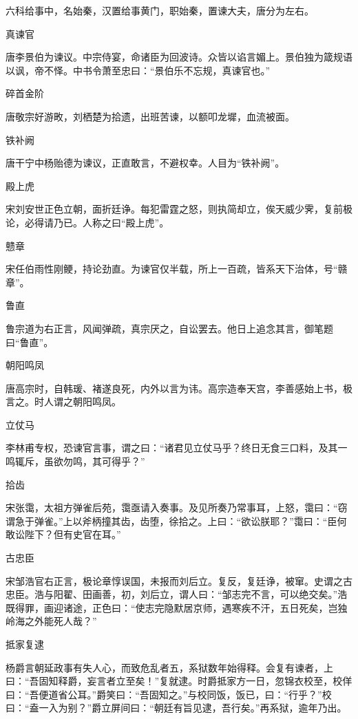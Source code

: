 \documentclass[a4paper,12pt,UTF8,twoside]{ctexbook}
\begin{document}
    六科给事中，名始秦，汉置给事黄门，职始秦，置谏大夫，唐分为左右。
    
    真谏官
    
    唐李景伯为谏议。中宗侍宴，命诸臣为回波诗。众皆以谄言媚上。景伯独为箴规语以讽，帝不怿。中书令萧至忠曰：“景伯乐不忘规，真谏官也。”
    
    碎首金阶
    
    唐敬宗好游畋，刘栖楚为拾遗，出班苦谏，以额叩龙墀，血流被面。
    
    铁补阙
    
    唐干宁中杨贻德为谏议，正直敢言，不避权幸。人目为“铁补阙”。
    
    殿上虎
    
    宋刘安世正色立朝，面折廷诤。每犯雷霆之怒，则执简却立，俟天威少霁，复前极论，必得请乃已。人称之曰“殿上虎”。
    
    戆章
    
    宋任伯雨性刚鲠，持论劲直。为谏官仅半载，所上一百疏，皆系天下治体，号“赣章”。
    
    鲁直
    
    鲁宗道为右正言，风闻弹疏，真宗厌之，自讼罢去。他日上追念其言，御笔题曰“鲁直”。
    
    朝阳鸣凤
    
    唐高宗时，自韩瑗、褚遂良死，内外以言为讳。高宗造奉天宫，李善感始上书，极言之。时人谓之朝阳鸣凤。
    
    立仗马
    
    李林甫专权，恐谏官言事，谓之曰：“诸君见立仗马乎？终日无食三口料，及其一鸣辄斥，虽欲勿鸣，其可得乎？”
    
    拾齿
    
    宋张霭，太祖方弹雀后苑，霭亟请入奏事。及见所奏乃常事耳，上怒，霭曰：“窃谓急于弹雀。”上以斧柄撞其齿，齿堕，徐拾之。上曰：“欲讼朕耶？”霭曰：“臣何敢讼陛下？但有史官在耳。”
    
    古忠臣
    
    宋邹浩官右正言，极论章惇误国，未报而刘后立。复反，复廷诤，被窜。史谓之古忠臣。浩与阳翟、田画善，初，刘后立，谓人曰：“邹志完不言，可以绝交矣。”浩既得罪，画迎诸途，正色曰：“使志完隐默居京师，遇寒疾不汗，五日死矣，岂独岭海之外能死人哉？”
    
    抵家复逮
    
    杨爵言朝延政事有失人心，而致危乱者五，系狱数年始得释。会复有谏者，上曰：“吾固知释爵，妄言者立至矣！”复就逮。时爵抵家方一日，忽锦衣校至，校佯曰：“吾便道省公耳。”爵笑曰：“吾固知之。”与校同饭，饭已，曰：“行乎？”校曰：“盍一入为别？”爵立屏间曰：“朝廷有旨见逮，吾行矣。”再系狱，逾年乃出。
    
\end{document}
